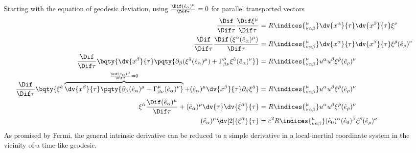 \documentclass[12pt]{article}
\begin{document}
        \subsubsection{} Starting with the equation of geodesic deviation, using \(\frac{\Dif (\hat{e}_\alpha)^\mu}{\Dif \tau} = 0\) for parallel transported vectors
        \begin{align*}
            \frac{\Dif }{\Dif \tau} \frac{\Dif \xi^\mu}{\Dif \tau} &=  R\indices{_{\nu \alpha\beta}^\mu} \dv{x^\alpha }{\tau} \dv{x^\beta}{\tau} \xi^\nu\\
            \frac{\Dif }{\Dif \tau} \frac{\Dif\,(\xi^{\hat{\alpha}}({\hat{ e}_\alpha})^\mu )}{\Dif \tau} &=  R\indices{_{\nu \alpha\beta}^\mu} \dv{x^\alpha }{\tau} \dv{x^\beta}{\tau} \xi^{\hat{\rho}}({\hat{ e}_\rho})^\nu \\
            \frac{\Dif }{\Dif \tau} \bqty{ \dv{x^\beta}{\tau} \pqty{\partial_\beta (\xi^{\hat{a}}(\hat{e}_\alpha)^\mu) + \Gamma^{\mu}_{\beta \nu}\xi^{\hat{a}}(\hat{e}_\alpha)^\nu}} &=  R\indices{_{\nu \alpha\beta}^\mu} u^\alpha  u^\beta \xi^{\hat{\rho}}({\hat{ e}_\rho})^\nu \\
            \frac{\Dif }{\Dif \tau} \bqty{ \xi^{\hat{a}}\overbrace{\dv{x^\beta}{\tau} \pqty{ \partial_\beta (\hat{e}_\alpha)^\mu + \Gamma^{\mu}_{\beta \nu}(\hat{e}_\alpha)^\nu}}^{\frac{\Dif (\hat{e}_\alpha)^\mu}{\Dif \tau} = 0} + (\hat{e}_\alpha)^\mu \dv{x^\beta}{\tau}  \partial_\beta \xi^{\hat{a}} } &=  R\indices{_{\nu \alpha\beta}^\mu} u^\alpha  u^\beta \xi^{\hat{\rho}}({\hat{ e}_\rho})^\nu \\
            \xi^{\hat{\alpha}} \frac{\Dif (\hat{e}_\alpha)^\mu}{\Dif \tau} + (\hat{e}_\alpha)^\mu \dv{\tau} \dv{\xi^{\hat{\alpha}}}{\tau} &=  R\indices{_{\nu \alpha\beta}^\mu} u^\alpha  u^\beta \xi^{\hat{\rho}}({\hat{ e}_\rho})^\nu \\
            ({\hat{ e}_\alpha})^\mu \dv[2]{\xi^{\hat{\alpha}}}{\tau} &=  c^2 R\indices{_{\nu \alpha\beta}^\mu} (\hat{e}_0)^\alpha (\hat{e}_0)^\beta \xi^{\hat{\rho}}({\hat{ e}_\rho})^\nu 
        \end{align*}
        As promised by Fermi, the general intrinsic derivative can be reduced to a simple derivative in a local-inertial coordinate system in the vicinity of a time-like geodesic.
\end{document}
